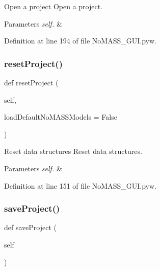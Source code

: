 Open a project Open a project. 


\begin{DoxyParams}{Parameters}
{\em self.} & \\
\hline
\end{DoxyParams}


Definition at line 194 of file No\+M\+A\+S\+S\+\_\+\+G\+U\+I.\+pyw.

\mbox{\label{class_no_m_a_s_s___g_u_i_1_1_app_abeee64cfa5bb453539b747213c594bbc}} 
\subsubsection{\texorpdfstring{reset\+Project()}{resetProject()}}
{\footnotesize\ttfamily def reset\+Project (\begin{DoxyParamCaption}\item[{}]{self,  }\item[{}]{load\+Default\+No\+M\+A\+S\+S\+Models = {\ttfamily False} }\end{DoxyParamCaption})}



Reset data structures Reset data structures. 


\begin{DoxyParams}{Parameters}
{\em self.} & \\
\hline
\end{DoxyParams}


Definition at line 151 of file No\+M\+A\+S\+S\+\_\+\+G\+U\+I.\+pyw.

\mbox{\label{class_no_m_a_s_s___g_u_i_1_1_app_a292a02cccaabec778b1dd648ac0aa146}} 
\subsubsection{\texorpdfstring{save\+Project()}{saveProject()}}
{\footnotesize\ttfamily def save\+Project (\begin{DoxyParamCaption}\item[{}]{self }\end{DoxyParamCaption})}



